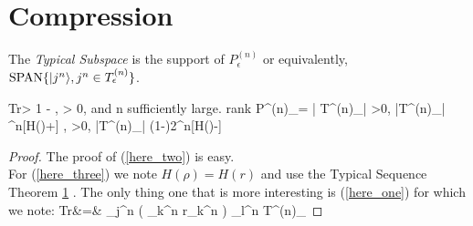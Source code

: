 \documentclass[aps,11pt,twoside,letterpaper]{article}
\def\Tr{\textup{Tr}}
\theoremstyle{plain}
\theoremstyle{definition}
\begin{document}
			
			
			
			
			


\section{Compression}

The \emph{Typical Subspace} is the support of $P^{(n)}_\epsilon$ or equivalently, 
\mbox{$\textup{SPAN} \{ | j^n \rangle, j^n \in T^{(n)}_\epsilon  \}$}.

	\be 
		\Tr{} > 1 - \delta \qquad \forall \delta, \epsilon > 0, 
		\textrm{and } n \textrm{ sufficiently large.}  			
		\label{here_one}
	\ee
	\be
		\textup{rank} P^{(n)}_\epsilon = | T^{(n)}_\epsilon |
		\label{here_two}
	\ee
	\be
		\forall \epsilon >0, \quad |T^{(n)}_\epsilon| ^{n[H(\rho)+\epsilon]} 
		\label{here_three}
	\ee
	\be
		\forall \epsilon, \delta >0, \quad |T^{(n)}_\epsilon| \geq (1-\delta)2^{n[H(\rho)-\epsilon]} 
		\label{here_four}
	\ee


\begin{proof}
The proof of (\ref{here_two}) is easy.\\
For (\ref{here_three}) we note $H(\rho) = H(r)$ and use the Typical Sequence Theorem \ref{} .
The only thing one that is more interesting is (\ref{here_one}) for which we note:
\bea
\Tr{} 	&=&	\sum_{j^n}  \left(
										\sum_{k^n} r_{k^n}\ket{k^n}\bra{k^n}  \right)
										\sum_{l^n \in T^{(n)}_\epsilon} 
\eea


\end{proof}
%


\end{document}
